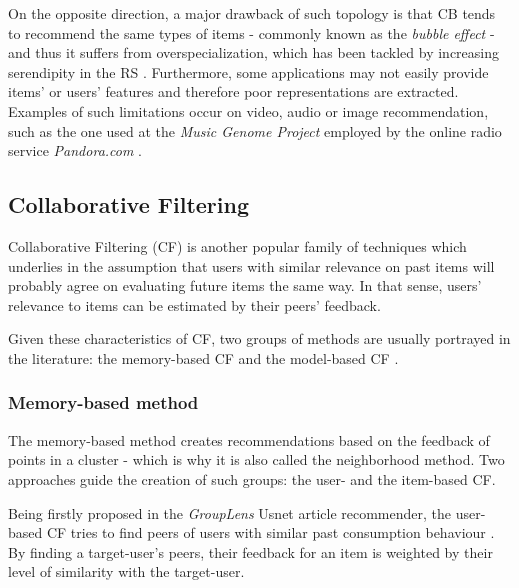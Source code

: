     On the opposite direction, a major drawback of such topology is that CB tends to recommend the same types of items - commonly known as the \textit{bubble effect} - and thus it suffers from overspecialization, which has been tackled by increasing serendipity in the RS \cite{10.1109/HIS.2008.25}. Furthermore, some applications may not easily provide items' or users' features and therefore poor representations are extracted. Examples of such limitations occur on video, audio or image recommendation, such as the one used at the \textit{Music Genome Project} employed by the online radio service \textit{Pandora.com}  \cite{2009MFTechniques}.

\subsection{Collaborative Filtering}
\label{sec:CF}

    Collaborative Filtering (CF)  is another popular family of techniques which underlies in the assumption     that users with similar relevance on past items will probably agree on evaluating future items the same way. In that sense, users' relevance to items can be estimated by their peers' feedback.

    Given these characteristics of CF, two groups of methods are usually portrayed in the literature: the memory-based CF and the model-based CF \cite{2010Handbook}. 

  \subsubsection{Memory-based method}

    The memory-based method creates recommendations based on the feedback of points in a cluster - which is why it is also called the neighborhood method. Two approaches guide the creation of such groups: the user- and the item-based CF.
    
    
    Being firstly proposed in the \textit{GroupLens} Usnet article recommender, the user-based CF tries to find peers of users with similar past consumption behaviour \cite{10.1145/192844.192905}. By finding a target-user's peers, their feedback for an item is weighted by their level of similarity with the target-user.
    
